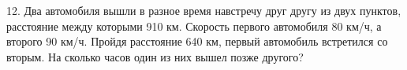 12. Два автомобиля вышли в разное время навстречу друг другу из двух пунктов, расстояние между которыми 910 км. Скорость первого автомобиля 80 км/ч, а второго 90 км/ч. Пройдя расстояние 640 км, первый автомобиль встретился со вторым. На сколько часов один из них вышел позже другого?\\
